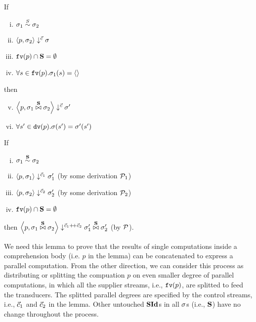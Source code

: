 \begin{lem} \label{lem-emp-join-sym}
	If 
	\begin{enumerate} [(i)]
		\item $\sgm_1 \~{S} \sgm_2$
		\item $\seval{p}{\sgm_2}{\c}{\sgm}$
		\item $\FV{p} \cap \S = \emptyset$
		\item $\forall s \in \FV{p}. \sgm_1(s) = \emptyv$
	\end{enumerate}
	then 
	\begin{enumerate}[(i)]
		\setcounter{enumi}{4}
		\item $\seval{p}{\sgm_1 \x{\S} \sgm_2}{\c}{\sgm'}$
		\item $\forall s' \in \dv{p}. \sgm(s') = \sgm'(s')$
	\end{enumerate}
\end{lem}

\begin{lem}  \label{lem-sgm-join}
	If 
	\begin{enumerate}[(i)]
		\item $\sgm_1 \~{\S} \sgm_2$
		\item $\seval{p}{\sgm_1}{\c_1}{\sgm_1'}$ (by some derivation $\MP_1$)
		\item $	\seval{p}{\sgm_2} {\c_2} {\sgm_2'}$ (by some derivation $\MP_2$)
		\item $\FV{p} \cap \S = \emptyset $
	\end{enumerate}
	then $\seval{p}{\sgm_1 \x\S \sgm_2}{\c_1 {\++} \c_2}{ \sgm_1' \x\S \sgm_2' }$ (by $\MP$).
\end{lem}

We need this lemma to prove that the results of single computations inside a comprehension body (i.e. $p$ in the lemma) can be concatenated to express a parallel computation. From the other direction, we can consider this process as distributing or splitting the compuation $p$ on even smaller degree of parallel computations, in which all the supplier streams, i.e., $\FV{p}$, are splitted to
feed the transducers. The splitted parallel degrees are specified by the
control streams, i.e., $\c_1$ and $\c_2$ in the lemma. Other untouched $\SId$s in all $\sgm$s (i.e., $\S$) have no change throughout the process.\\

